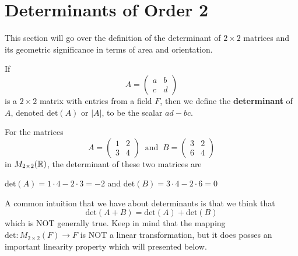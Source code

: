 \section{Determinants of Order 2}

This section will go over the definition of the determinant of \( 2 \times 2  \) matrices and its geometric significance in terms of area and orientation.

\begin{definition}[Determinants]
   If  
   \[  A = \begin{pmatrix}
       a & b \\
       c & d 
   \end{pmatrix} \] is a \( 2 \times 2  \) matrix with entries from a field \( F  \), then we define the \textbf{determinant} of \( A  \), denoted \( \text{det}(A)  \) or \( | A  |  \), to be the scalar \( ad - bc  \).
\end{definition}

\begin{eg}
    For the matrices
    \[  A = \begin{pmatrix}
        1 & 2 \\
        3 & 4 
    \end{pmatrix} \ \text{ and } \ B = \begin{pmatrix}
        3 & 2 \\
        6 & 4 
    \end{pmatrix} \] in \( {M}_{2 \times 2}(\mathbb{R}) \), the determinant of these two matrices are
    \begin{center}
        \( \text{det}(A) = 1 \cdot 4 - 2 \cdot 3 = -2  \) and \( \text{det}(B) = 3 \cdot 4 - 2 \cdot 6 = 0   \)
    \end{center}
\end{eg}

A common intuition that we have about determinants is that we think that
\[  \text{det}(A + B) = \text{det}(A) + \text{det}(B)  \]
which is NOT generally true. Keep in mind that the mapping \( \text{det} : {M}_{2 \times 2}(F) \to F   \) is NOT a linear transformation, but it does posses an important linearity property which will presented below.

